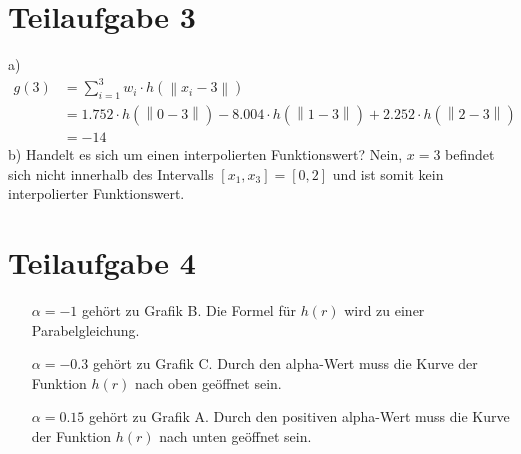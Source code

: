 \documentclass[a4paper, 11pt]{article}
\begin{document}
\section*{Teilaufgabe 3}
a)
\begin{align*}
	g(3) &= \sum_{i=1}^3 w_i \cdot h(\left\lVert x_i - 3 \right\rVert) \\
		 &= 1.752 \cdot h(\left\lVert 0 - 3 \right\rVert) - 8.004 \cdot h(\left\lVert 1 - 3 \right\rVert) + 2.252 \cdot h(\left\lVert 2 - 3 \right\rVert) \\
		 &= - 14 
\end{align*}
b) Handelt es sich um einen interpolierten Funktionswert? Nein, $x=3$ befindet sich nicht innerhalb des Intervalls $[x_1, x_3]=[0,2]$ und ist somit kein interpolierter Funktionswert.

\section*{Teilaufgabe 4}
\begin{enumerate}
	\item[$\alpha = -1$] gehört zu Grafik B. Die Formel für $h(r)$ wird zu einer Parabelgleichung.
	\item[$\alpha = -0.3$] gehört zu Grafik C. Durch den alpha-Wert muss die Kurve der Funktion $h(r)$ nach oben geöffnet sein.  
	\item[$\alpha = 0.15$] gehört zu Grafik A. Durch den positiven alpha-Wert muss die Kurve der Funktion $h(r)$ nach unten geöffnet sein.
\end{enumerate}
\end{document}
